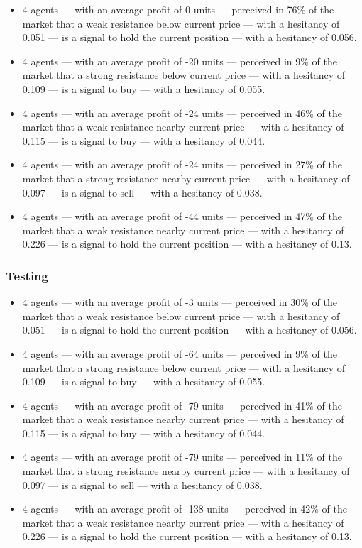 {\small
  \begin{itemize}
  \item 4 agents — with an average profit of 0 units — perceived in 76\% of the market that a weak resistance below current price — with a hesitancy of 0.051 — is a signal to hold the current position — with a hesitancy of 0.056.
  \item 4 agents — with an average profit of -20 units — perceived in 9\% of the market that a strong resistance below current price — with a hesitancy of 0.109 — is a signal to buy — with a hesitancy of 0.055.
  \item 4 agents — with an average profit of -24 units — perceived in 46\% of the market that a weak resistance nearby current price — with a hesitancy of 0.115 — is a signal to buy — with a hesitancy of 0.044.
  \item 4 agents — with an average profit of -24 units — perceived in 27\% of the market that a strong resistance nearby current price — with a hesitancy of 0.097 — is a signal to sell — with a hesitancy of 0.038.
  \item 4 agents — with an average profit of -44 units — perceived in 47\% of the market that a weak resistance nearby current price — with a hesitancy of 0.226 — is a signal to hold the current position — with a hesitancy of 0.13.
  \end{itemize}
}

\subsubsection{Testing}

{\small
  \begin{itemize}
  \item 4 agents — with an average profit of -3 units — perceived in 30\% of the market that a weak resistance below current price — with a hesitancy of 0.051 — is a signal to hold the current position — with a hesitancy of 0.056.
  \item 4 agents — with an average profit of -64 units — perceived in 9\% of the market that a strong resistance below current price — with a hesitancy of 0.109 — is a signal to buy — with a hesitancy of 0.055.
  \item 4 agents — with an average profit of -79 units — perceived in 41\% of the market that a weak resistance nearby current price — with a hesitancy of 0.115 — is a signal to buy — with a hesitancy of 0.044.
  \item 4 agents — with an average profit of -79 units — perceived in 11\% of the market that a strong resistance nearby current price — with a hesitancy of 0.097 — is a signal to sell — with a hesitancy of 0.038.
  \item 4 agents — with an average profit of -138 units — perceived in 42\% of the market that a weak resistance nearby current price — with a hesitancy of 0.226 — is a signal to hold the current position — with a hesitancy of 0.13.
  \end{itemize}
}

